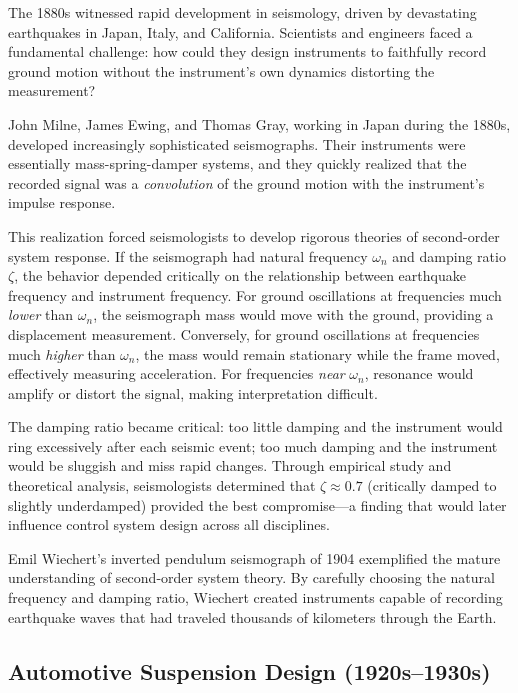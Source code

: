 The 1880s witnessed rapid development in seismology, driven by devastating earthquakes in Japan, Italy, and California. Scientists and engineers faced a fundamental challenge: how could they design instruments to faithfully record ground motion without the instrument's own dynamics distorting the measurement?

\begin{historicalbox}
John Milne, James Ewing, and Thomas Gray, working in Japan during the 1880s, developed increasingly sophisticated seismographs. Their instruments were essentially mass-spring-damper systems, and they quickly realized that the recorded signal was a \textit{convolution} of the ground motion with the instrument's impulse response.
\end{historicalbox}

This realization forced seismologists to develop rigorous theories of second-order system response. If the seismograph had natural frequency $\omega_n$ and damping ratio $\zeta$, the behavior depended critically on the relationship between earthquake frequency and instrument frequency. For ground oscillations at frequencies much \textit{lower} than $\omega_n$, the seismograph mass would move with the ground, providing a displacement measurement. Conversely, for ground oscillations at frequencies much \textit{higher} than $\omega_n$, the mass would remain stationary while the frame moved, effectively measuring acceleration. For frequencies \textit{near} $\omega_n$, resonance would amplify or distort the signal, making interpretation difficult.

The damping ratio became critical: too little damping and the instrument would ring excessively after each seismic event; too much damping and the instrument would be sluggish and miss rapid changes. Through empirical study and theoretical analysis, seismologists determined that $\zeta \approx 0.7$ (critically damped to slightly underdamped) provided the best compromise---a finding that would later influence control system design across all disciplines.

Emil Wiechert's inverted pendulum seismograph of 1904 exemplified the mature understanding of second-order system theory. By carefully choosing the natural frequency and damping ratio, Wiechert created instruments capable of recording earthquake waves that had traveled thousands of kilometers through the Earth.

\subsection{Automotive Suspension Design (1920s--1930s)}

